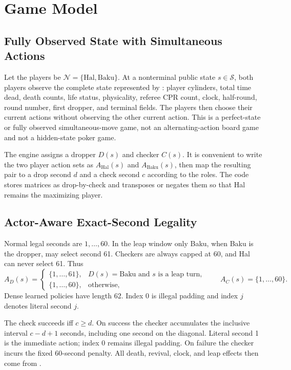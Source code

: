 \documentclass[11pt]{article}
\newcommand{\hal}{\mathrm{Hal}}
\newcommand{\baku}{\mathrm{Baku}}
\newcommand{\states}{\mathcal{S}}
\begin{document}
\section{Game Model}

\subsection{Fully Observed State with Simultaneous Actions}

Let the players be \(\mathcal{N}=\{\hal,\baku\}\). At a nonterminal public
state \(s\in\states\), both players observe the complete state represented by
: player cylinders, total time dead, death counts, life
status, physicality, referee CPR count, clock, half-round, round number, first
dropper, and terminal fields. The players then choose their current actions
without observing the other current action. This is a perfect-state or fully
observed simultaneous-move game, not an alternating-action board game and not
a hidden-state poker game.

The engine assigns a dropper \(D(s)\) and checker \(C(s)\). It is convenient
to write the two player action sets as \(A_{\hal}(s)\) and
\(A_{\baku}(s)\), then map the resulting pair to a drop second \(d\) and a
check second \(c\) according to the roles. The code stores matrices as
drop-by-check and transposes or negates them so that Hal remains the maximizing
player.

\subsection{Actor-Aware Exact-Second Legality}

Normal legal seconds are \(1,\ldots,60\). In the leap window only Baku, when
Baku is the dropper, may select second 61. Checkers are always capped at 60,
and Hal can never select 61. Thus
\[
A_D(s)=
\begin{cases}
\{1,\ldots,61\}, & D(s)=\baku \text{ and }s\text{ is a leap turn},\\
\{1,\ldots,60\}, & \text{otherwise},
\end{cases}
\qquad
A_C(s)=\{1,\ldots,60\}.
\]
Dense learned policies have length 62. Index 0 is illegal padding and index
\(j\) denotes literal second \(j\).

The check succeeds iff \(c\ge d\). On success the checker accumulates the
inclusive interval \(c-d+1\) seconds, including one second on the diagonal.
Literal second 1 is the immediate action; index 0 remains illegal padding. On failure the checker incurs
the fixed 60-second penalty. All death, revival, clock, and leap effects then
come from .
\end{document}

